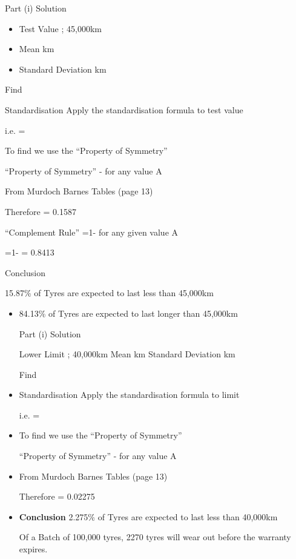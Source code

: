 \documentclass[]{report}
\begin{document}
Part (i) Solution

\begin{itemize}
	\item Test Value ; 45,000km			
	\item Mean		 km	
	\item Standard Deviation	 km
\end{itemize}


Find  

Standardisation
Apply the standardisation formula	 	to test value


i.e.  = 

To find   we use the “Property of Symmetry”

“Property of Symmetry” -   for any value A

From Murdoch Barnes Tables (page 13)  

Therefore   = 0.1587 

“Complement Rule”		 =1-  for any given value A

=1-  = 0.8413

Conclusion

15.87\% of Tyres are expected to last less than 45,000km

\begin{itemize}
\item 84.13\% of Tyres are expected to last longer than 45,000km




Part (i) Solution

Lower Limit ; 40,000km			Mean		 km	
Standard Deviation	 km

Find  

\item Standardisation
Apply the standardisation formula	 	to limit


i.e.  = 

\item To find   we use the “Property of Symmetry”

“Property of Symmetry” -   for any value A


\item From Murdoch Barnes Tables (page 13)  

Therefore   = 0.02275 

\item \textbf{Conclusion}
2.275\% of Tyres are expected to last less than 40,000km

Of a Batch of 100,000 tyres,  2270 tyres will wear out before the warranty expires.
\end{itemize}
\end{document}
